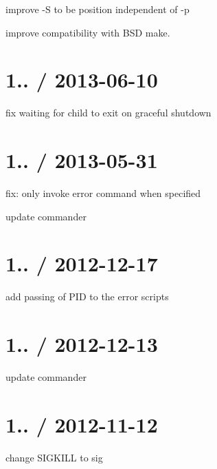 
\begin{DoxyItemize}
\item improve -\/S to be position independent of -\/p
\item improve compatibility with B\+SD make.
\end{DoxyItemize}

\section*{1.. / 2013-\/06-\/10 }


\begin{DoxyItemize}
\item fix waiting for child to exit on graceful shutdown
\end{DoxyItemize}

\section*{1.. / 2013-\/05-\/31 }


\begin{DoxyItemize}
\item fix\+: only invoke error command when specified
\item update commander
\end{DoxyItemize}

\section*{1.. / 2012-\/12-\/17 }


\begin{DoxyItemize}
\item add passing of P\+ID to the error scripts
\end{DoxyItemize}

\section*{1.. / 2012-\/12-\/13 }


\begin{DoxyItemize}
\item update commander
\end{DoxyItemize}

\section*{1.. / 2012-\/11-\/12 }


\begin{DoxyItemize}
\item change S\+I\+G\+K\+I\+LL to sig
\end{DoxyItemize}

